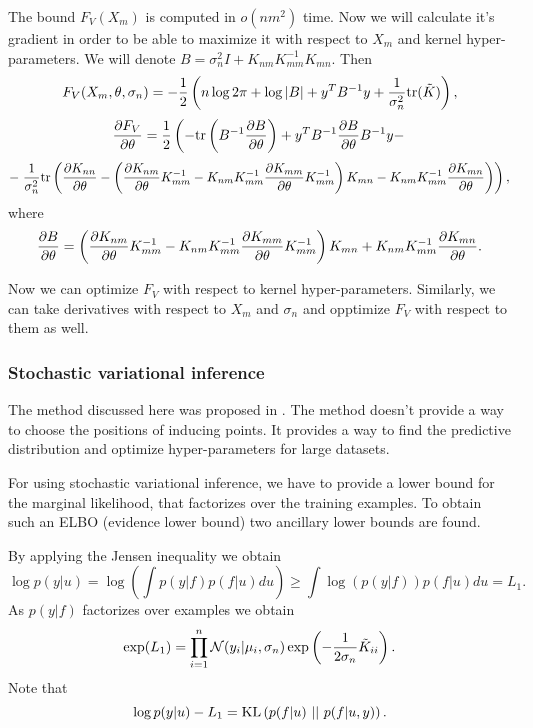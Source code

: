 \documentclass[12pt]{article}
\begin{document}
		The bound $F_V(X_m)$ is computed in $o(nm^2)$ time. Now we will calculate it's gradient in order to be able to maximize it with respect to $X_m$ and kernel hyper-parameters. We will denote $B = \sigma_n^2 I + K_{nm} K_{mm}^{-1} K_{mn}$. Then
		$$F_V(X_m, \theta, \sigma_n) = -\frac 1 2 \left(n \log 2\pi + \log |B| + y^T B^{-1} y + \frac 1 {\sigma_n^2} \mbox{tr}(\tilde K)\right),$$
		$$\frac{\partial F_V}{\partial \theta} = \frac 1 2 \left( -\mbox{tr} \left(B^{-1} \frac{\partial B}{\partial \theta}\right) + y^T B^{-1} \frac{\partial B}{\partial \theta} B^{-1} y - \right.$$    
		$$- \left. \frac 1 {\sigma_n^2} \mbox{tr}\left(\frac{\partial K_{nn}}{\partial \theta} - \left(\frac{\partial K_{nm}}{\partial \theta}K_{mm}^{-1} - K_{nm} K_{mm}^{-1} \frac{\partial K_{mm}}{\partial \theta}K_{mm}^{-1}\right) K_{mn} - K_{nm} K_{mm}^{-1} \frac{\partial K_{mn}}{\partial \theta}\right)\right),$$
		where
		$$\frac{\partial B}{\partial \theta} =\left(\frac{\partial K_{nm}}{\partial \theta}K_{mm}^{-1} - K_{nm} K_{mm}^{-1} \frac{\partial K_{mm}}{\partial \theta}K_{mm}^{-1}\right) K_{mn} +  K_{nm} K_{mm}^{-1} \frac{\partial K_{mn}}{\partial \theta}.$$

		Now we can optimize $F_V$ with respect to kernel hyper-parameters. Similarly, we can take derivatives with respect to $X_m$ and $\sigma_n$ and opptimize $F_V$ with respect to them as well.


	\pagebreak
	\subsubsection{Stochastic variational inference}
		\label{svi}
	
		\hspace{0.6cm}The method discussed here was proposed in \cite{BigData}. The method doesn't provide a way to choose the positions of inducing points. It provides a way to find the predictive distribution and optimize hyper-parameters for large datasets.
		
		For using stochastic variational inference, we have to provide a lower bound for the marginal likelihood, that factorizes over the training examples. To obtain such an ELBO (evidence lower bound) two ancillary lower bounds are found. 
		
		By applying the Jensen inequality we obtain
		$$ \log p(y | u) = \log \left ( \int p(y|f) p(f | u) du\right) \ge  \int \log (p(y|f)) p(f | u) du = L_1.$$	
		As $p(y | f)$ factorizes over examples we obtain
		$$\exp(L_1) = \prod_{i = 1}^{n} \mathcal{N}(y_i| \mu_i, \sigma_n) \exp \left( -\frac 1 {2\sigma_n} \tilde K_{ii}\right).$$
		Note that 
		$$\log p(y | u) - L_1 = \mbox{KL}\left(p(f | u)\mbox{ || }p(f | u, y)\right).$$
		
\end{document}

